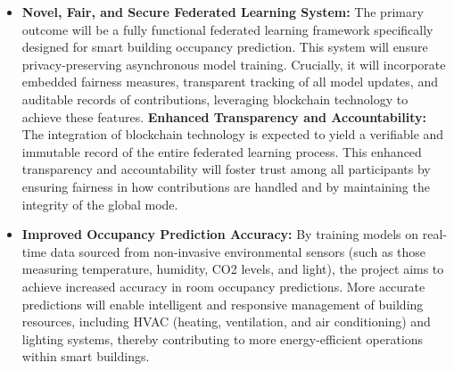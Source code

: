 \begin{itemize}
    \item \textbf{Novel, Fair, and Secure Federated Learning System:} The primary outcome will be a fully functional federated learning framework specifically designed for smart building occupancy prediction.
This system will ensure privacy-preserving asynchronous model training. Crucially, it will incorporate embedded fairness measures, transparent tracking of all model updates, and auditable records of contributions, leveraging blockchain technology to achieve these features.
    \textbf{Enhanced Transparency and Accountability:} The integration of blockchain technology is expected to yield a verifiable and immutable record of the entire federated learning process.
This enhanced transparency and accountability will foster trust among all participants by ensuring fairness in how contributions are handled and by maintaining the integrity of the global mode.
    \item \textbf{Improved Occupancy Prediction Accuracy:} By training models on real-time data sourced from non-invasive environmental sensors (such as those measuring temperature, humidity, CO2 levels, and light), the project aims to achieve increased accuracy in room occupancy predictions.
More accurate predictions will enable intelligent and responsive management of building resources, including HVAC (heating, ventilation, and air conditioning) and lighting systems, thereby contributing to more energy-efficient operations within smart buildings.
\end{itemize}